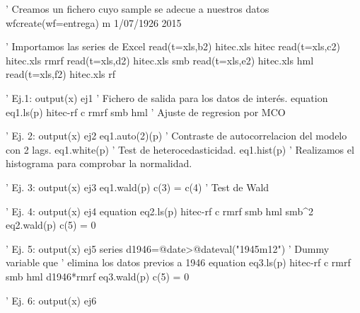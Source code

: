 

' Creamos un fichero cuyo sample se adecue a nuestros datos
wfcreate(wf=entrega) m 1/07/1926 2015

' Importamos las series de Excel
read(t=xls,b2) hitec.xls hitec
read(t=xls,c2) hitec.xls rmrf
read(t=xls,d2) hitec.xls smb
read(t=xls,e2) hitec.xls hml
read(t=xls,f2) hitec.xls rf

' Ej.1: 
output(x) ej1 ' Fichero de salida para los datos de interés.
equation eq1.ls(p) hitec-rf c rmrf smb hml ' Ajuste de regresion por MCO 

' Ej. 2:
output(x) ej2
eq1.auto(2)(p)   ' Contraste de autocorrelacion del modelo con 2 lags.
eq1.white(p) ' Test de heterocedasticidad.
eq1.hist(p) ' Realizamos el histograma para comprobar la normalidad.

' Ej. 3:
output(x) ej3
eq1.wald(p) c(3) = c(4) ' Test de Wald

' Ej. 4:
output(x) ej4
equation eq2.ls(p) hitec-rf c rmrf smb hml smb^2
eq2.wald(p) c(5) = 0

' Ej. 5:
output(x) ej5
series d1946=@date>@dateval("1945m12") ' Dummy variable que 
' elimina los datos previos a 1946
equation eq3.ls(p) hitec-rf c rmrf smb hml d1946*rmrf
eq3.wald(p) c(5) = 0

' Ej. 6:
output(x) ej6
